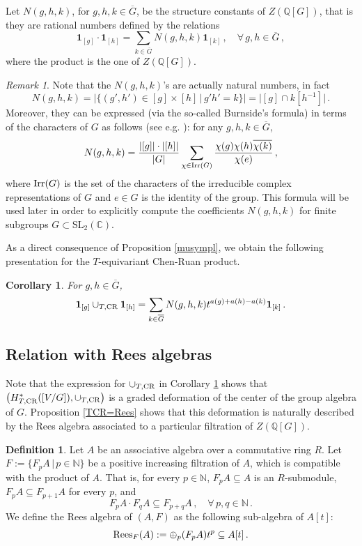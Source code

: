 \documentclass[a4paper,reqno]{amsart}
\theoremstyle{plain} %
\newtheorem{cor}[thm]{Corollary}
\theoremstyle{definition} %
\newtheorem{dfn}[thm]{Definition}
\theoremstyle{remark} %
\newtheorem{rmk}[thm]{Remark}
\newcommand{\N}{\mathbb{N}}
\newcommand{\Q}{\mathbb{Q}}
\newcommand{\C}{\mathbb{C}}
\newcommand{\fo}{\mathbf{1}}
\newcommand{\1}{\mathds{1}}   %
\begin{document}
Let $N(g, h, k)$, for $g, h, k \in \overline{G}$, be the structure constants of $Z\left( \Q[G]\right)$, that is they are rational numbers
defined by the relations
$$
\fo_{[g]} \cdot \fo_{[h]} = \sum_{k\in \overline{G}} N(g, h, k)\fo_{[k]} \, , \quad \forall \, g, h \in \overline{G} \, ,
$$
where the product is the one of $Z\left( \Q[G]\right)$.
\begin{rmk}\label{rmk_Burnside}
Note that the $N(g, h, k)$'s are actually natural numbers, in fact  
$$
N(g, h, k) = | \{ (g', h') \in [g] \times [h] \, | \, g'h'=k \} | = 
|[g] \cap k [h^{-1}]| \, .
$$
Moreover, they can be expressed (via the so-called Burnside's formula) 
in terms of the characters of $G$ as follows (see e.g. \cite[p. 45]{Isaacs}):
for any $g, h, k \in \overline{G}$,
\begin{equation}\label{Burnside}
N(g, h, k) = \frac{|[g]|\cdot |[h]|}{|G|} \sum_{\chi \in {\rm Irr}(G)}\frac{\chi (g) \chi (h) \overline{\chi (k)}}{\chi (e)} \, , 
\end{equation}
where ${\rm Irr}(G)$ is the set of the characters of
the irreducible complex representations of $G$ and $e\in G$ is the identity of the group. This formula will be used later in order to explicitly compute  the coefficients $N(g, h, k)$ for finite subgroups $G \subset \mathrm{SL}_2(\C)$.
\end{rmk}


As a direct consequence of Proposition \ref{musympl}, we obtain the following presentation for the $T$-equivariant Chen-Ruan 
product.

\begin{cor}\label{UTCRsympl}
For $g, h \in \overline{G}$,
$$
\fo_{[g]} \cup_{T, {\rm CR}} \fo_{[h]} = 
\sum_{k\in \overline{G}} N(g, h, k) t^{a(g)+a(h)-a(k)} \fo_{[k]} \, .
$$
\end{cor}

\subsection{Relation with Rees algebras}
Note that the  expression for $\cup_{T, {\rm CR}}$ in Corollary \ref{UTCRsympl}
shows that $\left( H^*_{T, {\rm CR}}([V/G]), \cup_{T, {\rm CR}} \right)$
is a graded deformation of the center of the group algebra of $G$. 
Proposition \ref{TCR=Rees} shows that this deformation is naturally described by the Rees algebra 
associated to a particular filtration of $Z\left( \Q[G]\right)$.

\begin{dfn}
Let $A$ be an associative algebra over a commutative ring $R$.  
Let $F:= \{ F_pA \, | \, p\in \N\}$ be a positive increasing filtration of $A$, 
which is compatible with the product of $A$.
That is, for every $p\in \N$, $F_pA \subseteq A$ is an $R$-submodule, $F_pA \subseteq F_{p+1}A$ for every $p$,
and 
$$
F_pA \cdot F_qA \subseteq F_{p+q}A \, , \quad \forall \, p, q \in \N \, .
$$
We define the Rees algebra of $(A, F)$ as the following sub-algebra of $A[t]$:
$$
{\rm Rees}_F(A) := \oplus_{p} (F_pA)t^p \subseteq A[t] \, .
$$
\end{dfn}
\end{document}
